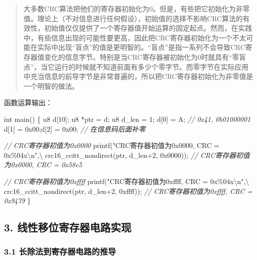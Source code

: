 \documentclass[
]{article}
\newenvironment{Shaded}{}{}
\newcommand{\BaseNTok}[1]{\textcolor[rgb]{0.25,0.63,0.44}{#1}}
\newcommand{\CharTok}[1]{\textcolor[rgb]{0.25,0.44,0.63}{#1}}
\newcommand{\CommentTok}[1]{\textcolor[rgb]{0.38,0.63,0.69}{\textit{#1}}}
\newcommand{\DataTypeTok}[1]{\textcolor[rgb]{0.56,0.13,0.00}{#1}}
\newcommand{\DecValTok}[1]{\textcolor[rgb]{0.25,0.63,0.44}{#1}}
\newcommand{\NormalTok}[1]{#1}
\newcommand{\SpecialCharTok}[1]{\textcolor[rgb]{0.25,0.44,0.63}{#1}}
\newcommand{\StringTok}[1]{\textcolor[rgb]{0.25,0.44,0.63}{#1}}
\begin{document}
\begin{quote}
大多数CRC算法把他们的寄存器初始化为0。但是，有些把它初始化为非零值。理论上（不对信息进行任何假设），初始值的选择不影响CRC算法的有效性，初始值仅仅提供了一个寄存器值开始运算的固定起点。然而，在实践中，有些信息出现的可能性要更高，因此把CRC寄存器初始化为一个不太可能在实际中出现``盲点''的值是更明智的。``盲点''是指一系列不会导致CRC寄存器值变化的信息字节。特别是当CRC寄存器被初始化为0时就具有``零盲点''，当它运行的时候就不知道前面有多少个零字节。而零字节在实际应用中充当信息的前导字节是非常普遍的，所以把CRC寄存器初始化为非零值是一个明智的做法。
\end{quote}

函数运算输出：

\begin{Shaded}
\begin{Highlighting}[]
\DataTypeTok{int}\NormalTok{ main()}
\NormalTok{\{}
\NormalTok{	u8 d[}\DecValTok{10}\NormalTok{];}
\NormalTok{	u8 *ptr = d;}
\NormalTok{	u8 d\_len = }\DecValTok{1}\NormalTok{;}
\NormalTok{	d[}\DecValTok{0}\NormalTok{] = }\CharTok{\textquotesingle{}A\textquotesingle{}}\NormalTok{; }\CommentTok{// 0x41, 0b01000001}
\NormalTok{	d[}\DecValTok{1}\NormalTok{] = }\BaseNTok{0x00}\NormalTok{;d[}\DecValTok{2}\NormalTok{] = }\BaseNTok{0x00}\NormalTok{; }\CommentTok{// 在信息码后面补零}
	
	\CommentTok{// CRC寄存器初值为0x0000}
\NormalTok{	printf(}\StringTok{"CRC寄存器初值为0x0000, CRC = 0x\%04x}\SpecialCharTok{\textbackslash{}n}\StringTok{"}\NormalTok{,\textbackslash{}}
\NormalTok{		crc16\_ccitt\_nondirect(ptr, d\_len+}\DecValTok{2}\NormalTok{, }\BaseNTok{0x0000}\NormalTok{));}
	\CommentTok{// CRC寄存器初值为0x0000, CRC = 0x58e5 }
	
	\CommentTok{// CRC寄存器初值为0xffff}
\NormalTok{	printf(}\StringTok{"CRC寄存器初值为0xffff, CRC = 0x\%04x}\SpecialCharTok{\textbackslash{}n}\StringTok{"}\NormalTok{,\textbackslash{}}
\NormalTok{		crc16\_ccitt\_nondirect(ptr, d\_len+}\DecValTok{2}\NormalTok{, }\BaseNTok{0xffff}\NormalTok{));}
    \CommentTok{// CRC寄存器初值为0xffff, CRC = 0x9479}
\NormalTok{\}}
\end{Highlighting}
\end{Shaded}

\hypertarget{header-n131}{%
\subsection{3. 线性移位寄存器电路实现}\label{header-n131}}

\hypertarget{header-n132}{%
\subsubsection{3.1 长除法到寄存器电路的推导}\label{header-n132}}
\end{document}
